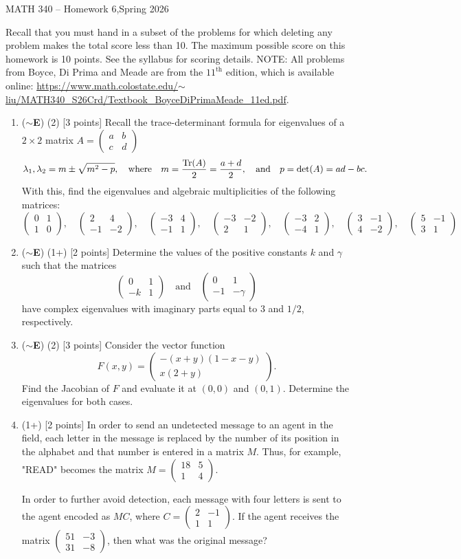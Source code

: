 \documentclass[12pt]{article}
\newcommand{\twobyone}[2]{\begin{pmatrix} %
   #1 \\ #2 \end{pmatrix}}
\newcommand{\twobytwo}[4]{\begin{pmatrix} %
   #1 & #2 \\ #3 & #4 \end{pmatrix}}
\begin{document}
\begin{center}
    {\Large MATH 340 -- Homework 6,\quad Spring 2026}
\end{center}

Recall that you must hand in a subset of the problems for which deleting any problem makes the total score less than 10. The maximum possible score on this homework is 10 points. See the syllabus for scoring details. NOTE: All problems from Boyce, Di Prima and Meade are from the \(11^{\text{th}}\)  edition, which is available online: \href{https://www.math.colostate.edu/~liu/MATH340_S26Crd/Textbook_BoyceDiPrimaMeade_11ed.pdf}{https://www.math.colostate.edu/\(\sim\)liu/MATH340\_S26Crd/Textbook\_BoyceDiPrimaMeade\_11ed.pdf}.

\begin{enumerate}
  
  \item (\(\sim\)\textbf{E}) (2) [3 points] Recall the trace-determinant formula for eigenvalues of a \(2\times 2\) matrix \(A= \twobytwo{a}{b}{c}{d}\)
  \[
  \lambda_{1},\lambda_{2}=m\pm\sqrt{m^2-p},\quad\text{where}\quad m=\frac{\Tr(A)}{2}=\frac{a+d}{2},\quad\text{and}\quad p=\det(A)=ad-bc.
  \]
  With this, find the eigenvalues and algebraic multiplicities of the following matrices:
  \[\twobytwo{0}{1}{1}{0},\quad \twobytwo{2}{4}{-1}{-2},\quad \twobytwo{-3}{4}{-1}{1},\quad \twobytwo{-3}{-2}{2}{1},\quad \twobytwo{-3}{2}{-4}{1},\quad \twobytwo{3}{-1}{4}{-2},\quad\twobytwo{5}{-1}{3}{1}\]
  
  \item (\(\sim\)\textbf{E}) (1+) [2 points] Determine the values of the positive constants \(k\) and \(\gamma\) such that the matrices
\[\twobytwo{0}{1}{-k}{1}\quad \text{and} \quad \twobytwo{0}{1}{-1}{-\gamma}\]
have complex eigenvalues with imaginary parts equal to \(3\) and \(1/2\), respectively.

\item (\(\sim\)\textbf{E}) (2) [3 points] Consider the vector function
\[F(x,y)=\twobyone{-(x+y)(1-x-y)}{x(2+y)}.\]
Find the Jacobian of \(F\) and evaluate it at \((0,0)\) and \((0,1)\). Determine the eigenvalues for both cases.

\item (1+) [2 points] In order to send an undetected message to an agent in the field, each letter in the message is replaced by the
number of its position in the alphabet and that number is entered in a matrix \(M\). Thus, for example, "READ" becomes the matrix \(M=\twobytwo{18}{5}{1}{4}\).\par
In order to further avoid detection, each message with four letters is sent to the agent encoded as \(MC\), where \(C=\twobytwo{2}{-1}{1}{1}\). If the agent receives the matrix \(\twobytwo{51}{-3}{31}{-8}\), then what was the original message?


\end{enumerate}
\end{document}
